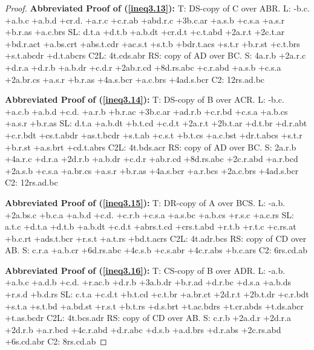 \documentclass[10pt,journal]{IEEEtran}
\begin{document}
\begin{proof}
{\bf Abbreviated Proof of (\ref{ineq3.13}):}
T: DS-copy of C over ABR.\newline
L: -b.c. +a.b.c +a.b.d +cr.d. +a.r.c +c.r.ab +abd.r.c +3b.c.ar +a.s.b +c.s.a +a.s.r +b.r.as +a.c.brs\newline
SL: d.t.a +d.t.b +a.b.dt +cr.d.t +c.t.abd +2a.r.t +2c.t.ar +bd.r.act +a.bs.crt +abs.t.cdr +ac.s.t +s.t.b +bdr.t.acs +s.t.r +b.r.st +c.t.brs +s.t.abcdr +d.t.abcrs
C2L: 4t.cds.abr\newline
RS:
copy of AD over BC.\newline
S: 4a.r.b +2a.r.c +d.r.a +d.r.b +a.b.dr +c.d.r +2ab.r.cd +8d.rs.abc +c.r.abd +a.s.b +c.s.a +2a.br.cs +a.s.r +b.r.as +4a.s.bcr +a.c.brs +4ad.s.bcr
C2: 12rs.ad.bc\newline

{\bf Abbreviated Proof of (\ref{ineq3.14}):}
T: DS-copy of B over ACR.\newline
L: -b.c. +a.c.b +a.b.d +c.d. +a.r.b +b.r.ac +3b.c.ar +ad.r.b +c.r.bd +c.s.a +a.b.cs +a.s.r +b.r.as\newline
SL: d.t.a +a.b.dt +b.t.cd +c.d.t +2a.r.t +2b.t.ar +d.t.br +d.r.abt +c.r.bdt +cs.t.abdr +as.t.bcdr +s.t.ab +c.s.t +b.t.cs +a.c.bst +dr.t.abcs +s.t.r +b.r.st +a.s.brt +cd.t.abrs
C2L: 4t.bds.acr\newline
RS:
copy of AD over BC.\newline
S: 2a.r.b +4a.r.c +d.r.a +2d.r.b +a.b.dr +c.d.r +ab.r.cd +8d.rs.abc +2c.r.abd +a.r.bcd +2a.s.b +c.s.a +a.br.cs +a.s.r +b.r.as +4a.s.bcr +a.r.bcs +2a.c.brs +4ad.s.bcr
C2: 12rs.ad.bc\newline


{\bf Abbreviated Proof of (\ref{ineq3.15}):}
T: DR-copy of A over BCS.\newline
L: -a.b. +2a.bs.c +b.c.a +a.b.d +c.d. +c.r.b +c.s.a +a.s.bc +a.b.cs +r.s.c +a.c.rs\newline
SL: a.t.c +d.t.a +d.t.b +a.b.dt +c.d.t +abrs.t.cd +crs.t.abd +r.t.b +r.t.c +c.rs.at +b.c.rt +ads.t.bcr +r.s.t +a.t.rs +bd.t.acrs
C2L: 4t.adr.bcs\newline
RS:
copy of CD over AB.\newline
S: c.r.a +a.b.cr +6d.rs.abc +4c.s.b +c.s.abr +4c.r.abs +b.c.ars
C2: 6rs.cd.ab\newline


{\bf Abbreviated Proof of (\ref{ineq3.16}):}
T: CS-copy of B over ADR.\newline
L: -a.b. +a.b.c +a.d.b +c.d. +r.ac.b +d.r.b +3a.b.dr +b.r.ad +d.r.bc +d.s.a +a.b.ds +r.s.d +b.d.rs\newline
SL: c.t.a +c.d.t +b.t.cd +c.t.br +a.br.ct +2d.r.t +2b.t.dr +c.r.bdt +s.t.a +s.t.bd +a.bd.st +r.s.t +b.t.rs +d.s.brt +t.ac.bdrs +t.cr.abds +t.ds.abcr +t.as.bcdr
C2L: 4t.bcs.adr\newline
RS:
copy of CD over AB.\newline
S: c.r.b +2a.d.r +2d.r.a +2d.r.b +a.r.bcd +4c.r.abd +d.r.abc +d.s.b +a.d.brs +d.r.abs +2c.rs.abd +6s.cd.abr
C2: 8rs.cd.ab\newline
\end{proof}
\end{document}
